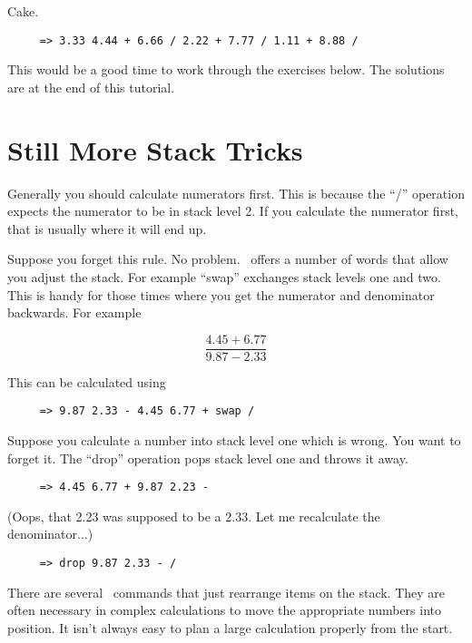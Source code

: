 Cake.

\begin{verbatim}
     => 3.33 4.44 + 6.66 / 2.22 + 7.77 / 1.11 + 8.88 /
\end{verbatim}

This would be a good time to work through the exercises below. The solutions are at the end of
this tutorial.

\section{Still More Stack Tricks}

Generally you should calculate numerators first. This is because the ``/'' operation expects the
numerator to be in stack level 2. If you calculate the numerator first, that is usually where it
will end up.

Suppose you forget this rule. No problem. \CLAC\ offers a number of words that allow you adjust
the stack. For example ``swap'' exchanges stack levels one and two. This is handy for those
times where you get the numerator and denominator backwards. For example

\begin{displaymath}
     \frac{ 4.45 + 6.77 }{ 9.87 - 2.33 }
\end{displaymath}

This can be calculated using

\begin{verbatim}
     => 9.87 2.33 - 4.45 6.77 + swap /
\end{verbatim}

Suppose you calculate a number into stack level one which is wrong. You want to forget it. The
``drop'' operation pops stack level one and throws it away.

\begin{verbatim}
     => 4.45 6.77 + 9.87 2.23 -
\end{verbatim}

(Oops, that 2.23 was supposed to be a 2.33. Let me recalculate the denominator...)

\begin{verbatim}
     => drop 9.87 2.33 - /
\end{verbatim}

There are several \CLAC\ commands that just rearrange items on the stack. They are often
necessary in complex calculations to move the appropriate numbers into position. It isn't always
easy to plan a large calculation properly from the start.

